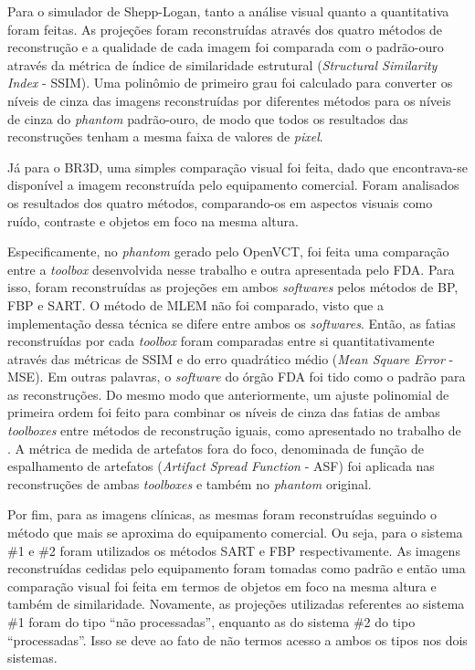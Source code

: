 Para o simulador de Shepp-Logan, tanto a análise visual quanto a quantitativa foram feitas. As projeções foram reconstruídas através dos quatro métodos de reconstrução e a qualidade de cada imagem foi comparada com o padrão-ouro através da métrica de índice de similaridade estrutural (\textit{Structural Similarity Index} - \acs{SSIM}). Uma polinômio de primeiro grau foi calculado para converter os níveis de cinza das imagens reconstruídas por diferentes métodos para os níveis de cinza do \textit{phantom} padrão-ouro, de modo que todos os resultados das reconstruções tenham a mesma faixa de valores de \textit{pixel}.

Já para o BR3D, uma simples comparação visual foi feita, dado que encontrava-se disponível a imagem reconstruída pelo equipamento comercial. Foram analisados os resultados dos quatro métodos, comparando-os em aspectos visuais como ruído, contraste e objetos em foco na mesma altura. 

Especificamente, no \textit{phantom} gerado pelo OpenVCT, foi feita uma comparação entre a \textit{toolbox} desenvolvida nesse trabalho e outra apresentada pelo \acs{FDA}. Para isso, foram reconstruídas as projeções em ambos \textit{softwares} pelos métodos de \acs{BP}, \acs{FBP} e \acs{SART}. O método de \acs{MLEM} não foi comparado, visto que a implementação dessa técnica se difere entre ambos os \textit{softwares}. Então, as fatias reconstruídas por cada \textit{toolbox} foram comparadas entre si quantitativamente através das métricas de \acs{SSIM} e do erro quadrático médio (\textit{Mean Square Error} - \acs{MSE}). Em outras palavras, o \textit{software} do órgão \acs{FDA} foi tido como o padrão para as reconstruções.  Do mesmo modo que anteriormente, um ajuste polinomial de primeira ordem foi feito para combinar os níveis de cinza das fatias de ambas \textit{toolboxes} entre métodos de reconstrução iguais, como apresentado no trabalho de . A métrica de medida de artefatos fora do foco, denominada de função de espalhamento de artefatos (\textit{Artifact Spread Function} - \acs{ASF}) foi aplicada nas reconstruções de ambas \textit{toolboxes} e também no \textit{phantom} original.

Por fim, para as imagens clínicas, as mesmas foram reconstruídas seguindo o método que mais se aproxima do equipamento comercial. Ou seja, para o sistema \#1 e \#2 foram utilizados os métodos \acs{SART} e \acs{FBP} respectivamente. As imagens reconstruídas cedidas pelo equipamento foram tomadas como padrão e então uma comparação visual foi feita em termos de objetos em foco na mesma altura e também de similaridade. Novamente, as projeções utilizadas referentes ao sistema \#1 foram do tipo ``não processadas'', enquanto as do sistema \#2 do tipo ``processadas''. Isso se deve ao fato de não termos acesso a ambos os tipos nos dois sistemas.  


